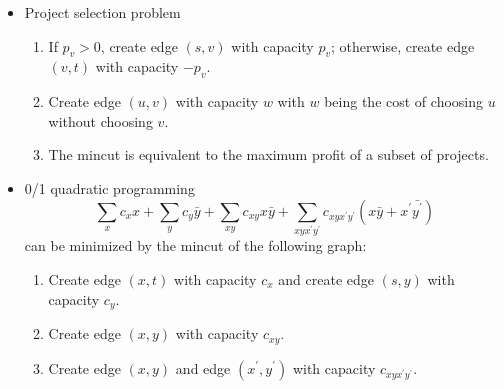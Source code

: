 \begin{itemize}
    \item Project selection problem
    \begin{enumerate}
      \item If $p_v > 0$, create edge $(s, v)$ with capacity $p_v$; otherwise, create edge $(v, t)$ with capacity $-p_v$.
      \item Create edge $(u, v)$ with capacity $w$ with $w$ being the cost of choosing $u$ without choosing $v$.
      \item The mincut is equivalent to the maximum profit of a subset of projects.
    \end{enumerate}
    \item 0/1 quadratic programming
    \[ \sum_x{c_xx} + \sum_y{c_y\bar{y}} + \sum_{xy}c_{xy}x\bar{y} + \sum_{xyx^\prime y^\prime}c_{xyx^\prime y^\prime}(x\bar{y} + x^\prime\bar{y^\prime}) \]
    can be minimized by the mincut of the following graph:
    \begin{enumerate}
      \item Create edge $(x, t)$ with capacity $c_x$ and create edge $(s, y)$ with capacity $c_y$.
      \item Create edge $(x, y)$ with capacity $c_{xy}$.
      \item Create edge $(x, y)$ and edge $(x^\prime, y^\prime)$ with capacity $c_{xyx^\prime y^\prime}$.
    \end{enumerate}
\end{itemize}

